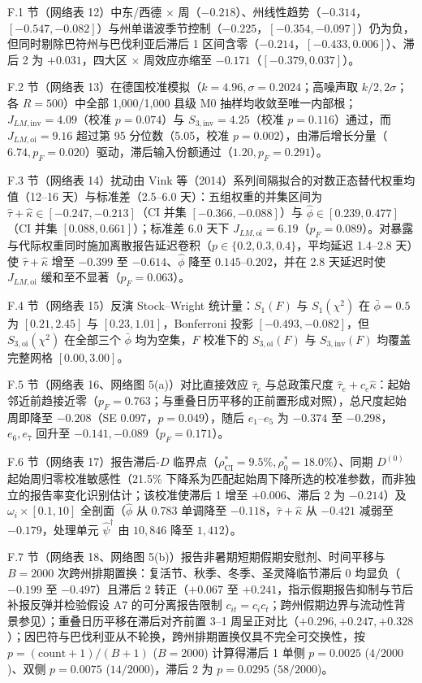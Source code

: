 \documentclass[11pt,a4paper]{ctexart}
\theoremstyle{definition}
\begin{document}
F.1 节（网络表 12）中东/西德 $\times$ 周（$-0.218$）、州线性趋势（$-0.314$，$[-0.547,-0.082]$）与州单谐波季节控制（$-0.225$，$[-0.354,-0.097]$）仍为负，但同时剔除巴符州与巴伐利亚后滞后 1 区间含零（$-0.214$，$[-0.433,0.006]$）、滞后 2 为 $+0.031$，四大区 $\times$ 周效应亦缩至 $-0.171$（$[-0.379,0.037]$）。

F.2 节（网络表 13）在德国校准模拟（$k=4.96, \sigma=0.2024$；高噪声取 $k/2, 2\sigma$；各 $R=500$）中全部 1,000/1,000 县级 M0 抽样均收敛至唯一内部根；$J_{LM,\mathrm{inv}}=4.09$（校准 $p=0.074$）与 $S_{3,\mathrm{inv}}=4.25$（校准 $p=0.116$）通过，而 $J_{LM,\mathrm{oi}}=9.16$ 超过第 95 分位数（5.05，校准 $p=0.002$），由滞后增长分量（$6.74, p_F=0.020$）驱动，滞后输入份额通过（$1.20, p_F=0.291$）。

F.3 节（网络表 14）扰动由 Vink 等（2014）系列间隔拟合的对数正态替代权重均值（12--16 天）与标准差（2.5--6.0 天）：五组权重的并集区间为 $\hat\tau+\hat\kappa\in[-0.247,-0.213]$（CI 并集 $[-0.366,-0.088]$）与 $\hat\phi\in[0.239,0.477]$（CI 并集 $[0.088,0.661]$）；标准差 6.0 天下 $J_{LM,\mathrm{oi}}=6.19$（$p_F=0.089$）。对暴露与代际权重同时施加离散报告延迟卷积（$p\in\{0.2,0.3,0.4\}$，平均延迟 1.4--2.8 天）使 $\hat\tau+\hat\kappa$ 增至 $-0.399$ 至 $-0.614$、$\hat\phi$ 降至 $0.145$--$0.202$，并在 2.8 天延迟时使 $J_{LM,\mathrm{oi}}$ 缓和至不显著（$p_F=0.063$）。

F.4 节（网络表 15）反演 Stock--Wright 统计量：$S_1(F)$ 与 $S_1(\chi^2)$ 在 $\bar\phi=0.5$ 为 $[0.21,2.45]$ 与 $[0.23,1.01]$，Bonferroni 投影 $[-0.493,-0.082]$，但 $S_{3,\mathrm{oi}}(\chi^2)$ 在全部三个 $\bar\phi$ 均为空集，$F$ 校准下的 $S_{3,\mathrm{oi}}(F)$ 与 $S_{3,\mathrm{inv}}(F)$ 均覆盖完整网格 $[0.00,3.00]$。

F.5 节（网络表 16、网络图 5(a)）对比直接效应 $\hat\tau_e$ 与总政策尺度 $\hat\tau_e+c_e\hat\kappa$：起始邻近前趋接近零（$p_F=0.763$；与重叠日历平移的正前置形成对照），总尺度起始周即降至 $-0.208$（SE $0.097$，$p=0.049$），随后 $e_1$--$e_5$ 为 $-0.374$ 至 $-0.298$，$e_6,e_7$ 回升至 $-0.141,-0.089$（$p_F=0.171$）。

F.6 节（网络表 17）报告滞后-$D$ 临界点（$\rho^*_{\mathrm{CI}}=9.5\%,\rho^*_0=18.0\%$）、同期 $D^{(0)}$ 起始周归零校准敏感性（21.5\% 下降系为匹配起始周下降所选的校准参数，而非独立的报告率变化识别估计；该校准使滞后 1 增至 $+0.006$、滞后 2 为 $-0.214$）及 $\omega_i\times[0.1,10]$ 全剖面（$\hat\phi$ 从 $0.783$ 单调降至 $-0.118$，$\hat\tau+\hat\kappa$ 从 $-0.421$ 减弱至 $-0.179$，处理单元 $\hat\psi^\dagger$ 由 $10{,}846$ 降至 $1{,}412$）。

F.7 节（网络表 18、网络图 5(b)）报告非暑期短期假期安慰剂、时间平移与 $B=2000$ 次跨州排期置换：复活节、秋季、冬季、圣灵降临节滞后 0 均显负（$-0.199$ 至 $-0.497$）且滞后 2 转正（$+0.067$ 至 $+0.241$，指示假期报告抑制与节后补报反弹并检验假设 A7 的可分离报告限制 $c_{it}=c_i c_t$；跨州假期边界与流动性背景参见\citealp{vonbismarckosten2022schools}）；重叠日历平移在滞后对齐前置 3--1 周呈正对比（$+0.296,+0.247,+0.328$）；因巴符与巴伐利亚从不轮换，跨州排期置换仅具不完全可交换性，按 $p=(\mathrm{count}+1)/(B+1)$ ($B=2000$) 计算得滞后 1 单侧 $p=0.0025$ ($4/2000$)、双侧 $p=0.0075$ ($14/2000$)，滞后 2 为 $p=0.0295$ ($58/2000$)。



\end{document}

